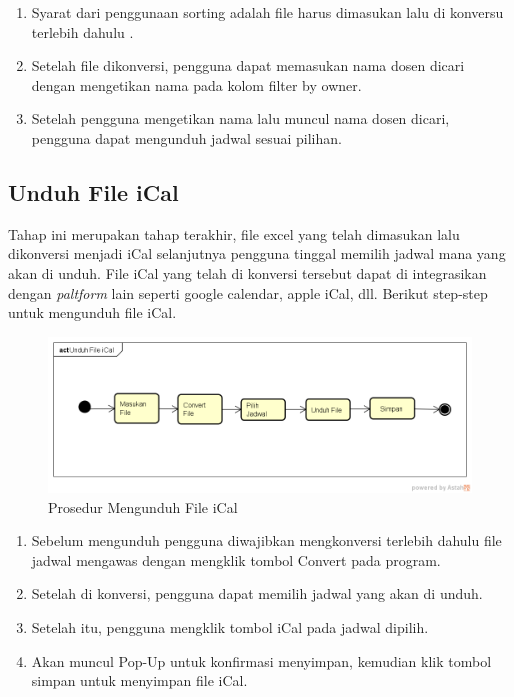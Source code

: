 \begin{enumerate}
	\item Syarat dari penggunaan sorting adalah file harus dimasukan lalu di konversu terlebih dahulu .
	\item Setelah file dikonversi, pengguna dapat memasukan nama dosen dicari dengan mengetikan nama pada kolom filter by owner.
	\item Setelah pengguna mengetikan nama lalu muncul nama dosen dicari, pengguna dapat mengunduh jadwal sesuai pilihan.
\end{enumerate}

\subsection{Unduh File iCal}
Tahap ini merupakan tahap terakhir, file excel yang telah dimasukan lalu dikonversi menjadi iCal selanjutnya pengguna tinggal memilih jadwal mana yang akan di unduh. File iCal yang telah di konversi tersebut dapat di integrasikan dengan \textit{paltform} lain seperti google calendar, apple iCal, dll. Berikut step-step untuk mengunduh file iCal.
\begin{figure}[h]
	\centering
	\includegraphics[scale=0.5]{Gambar/Unduh-File-iCal}
	\caption{Prosedur Mengunduh File iCal}
	\end{figure}

\begin{enumerate}
	\item Sebelum mengunduh pengguna diwajibkan mengkonversi terlebih dahulu file jadwal mengawas dengan mengklik tombol Convert pada program.
	\item Setelah di konversi, pengguna dapat memilih jadwal yang akan di unduh.
	\item Setelah itu, pengguna mengklik tombol iCal pada jadwal dipilih.
	\item Akan muncul Pop-Up untuk konfirmasi menyimpan, kemudian klik tombol simpan untuk menyimpan file iCal.
\end{enumerate}